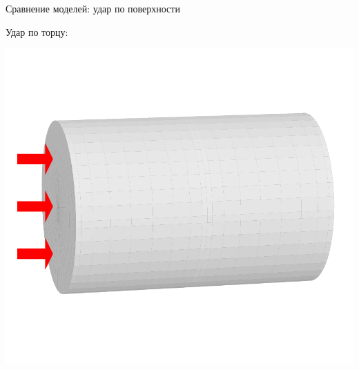 \documentclass[usenames,dvipsnames]{beamer}
\begin{document}
\begin{frame}{Сравнение моделей: удар по поверхности}
\vspace{2mm}
\begin{minipage}{\textwidth}
	\begin{minipage}[b]{0.65\textwidth}
		\flushleft
		Удар по торцу:
	\end{minipage}
	\hfill
	\begin{minipage}[b]{0.34\textwidth}
		\includegraphics[width=\linewidth]{Figures/ImpactScheme}
	\end{minipage}
\end{minipage}
\end{frame}
\end{document}
